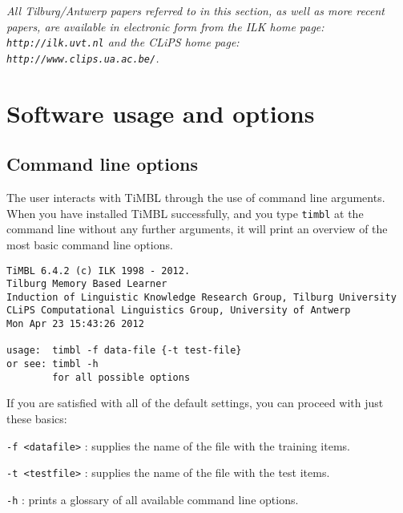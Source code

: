 \documentclass{book}
\begin{document}
{\it All Tilburg/Antwerp papers referred to in this section, as well
as more recent papers, are available in electronic form from the {\sc
ILK} home page: {\tt http://ilk.uvt.nl} and the {\sc CLiPS} home page: \\
{\tt http://www.clips.ua.ac.be/}.}

\chapter{Software usage and options}
\label{reference}

\section{Command line options}
\label{commandline}

The user interacts with TiMBL through the use of command line arguments.
When you have installed TiMBL successfully, and you type {\tt timbl} at the
command line without any further arguments, it will print an overview
of the most basic command line options. 

{\footnotesize
\begin{verbatim}
TiMBL 6.4.2 (c) ILK 1998 - 2012.
Tilburg Memory Based Learner
Induction of Linguistic Knowledge Research Group, Tilburg University
CLiPS Computational Linguistics Group, University of Antwerp
Mon Apr 23 15:43:26 2012

usage:  timbl -f data-file {-t test-file}
or see: timbl -h
        for all possible options
\end{verbatim}
}

If you are satisfied with all of the default settings, you can proceed
with just these basics:

\begin{description}

\item {\tt -f <datafile>} : supplies the name of the file with the
training items.
\item {\tt -t <testfile>} : supplies the name of the file with the
test items.
\item {\tt -h} : prints a glossary of all available command line 
options.

\end{description}
\end{document}
